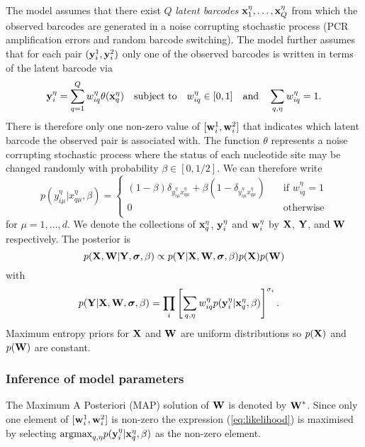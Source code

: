 \begin{footnotesize}
The model assumes that there exist $Q$ \emph{latent barcodes} $\boldsymbol{\mathbf{x}}_1^{\eta},\ldots,\boldsymbol{\mathbf{x}}_Q^{\eta}$ from which the observed barcodes are generated in a noise corrupting stochastic process (PCR amplification errors and random barcode switching). The model further assumes that for each pair $(\boldsymbol{\mathbf{y}}_i^1,\boldsymbol{\mathbf{y}}_i^2)$ only one of the observed barcodes is written in terms of the latent barcode via
\begin{equation}
\boldsymbol{\mathbf{y}}_i^{\eta} = \sum_{q=1}^Q w_{iq}^{\eta}\theta(\boldsymbol{\mathbf{x}}_{q}^{\eta})\quad\text{subject to}\quad w_{iq}^{\eta}\in[0,1]\quad\text{and}\quad\sum_{q,\eta} w_{iq}^{\eta} = 1.
\end{equation}
There is therefore only one non-zero value of $[\boldsymbol{\mathbf{w}}_i^1,\boldsymbol{\mathbf{w}}_i^2]$ that indicates which latent barcode the observed pair is associated with. The function $\theta$ represents a noise corrupting stochastic process where the status of each nucleotide site may be changed randomly with probability $\beta\in[0,1/2]$. We can therefore write
\begin{equation}
p(y_{i\mu}^{\eta}|x_{q\mu}^{\eta},\beta) = \left\{
\begin{array}{lr}
(1-\beta)\delta_{y_{i\mu}^{\eta}x_{q\mu}^{\eta}} + \beta (1-\delta_{y_{i\mu}^{\eta}x_{q\mu}^{\eta}})&\quad\text{if $w_{iq}^{\eta}=1$}\\
0&\quad\text{otherwise}\\
\end{array}
\right.
\end{equation}
for $\mu=1,\ldots,d$. We denote the collections of $\boldsymbol{\mathbf{x}}_{q}^{\eta}$, $\boldsymbol{\mathbf{y}}_i^{\eta}$ and $\boldsymbol{\mathbf{w}}_i^{\eta}$ by $\boldsymbol{\mathbf{X}}$, $\boldsymbol{\mathbf{Y}}$, and $\boldsymbol{\mathbf{W}}$ respectively. The posterior is
\begin{equation}
p(\boldsymbol{\mathbf{X}},\boldsymbol{\mathbf{W}}|\boldsymbol{\mathbf{Y}},\boldsymbol{\sigma},\beta) \propto p(\boldsymbol{\mathbf{Y}}|\boldsymbol{\mathbf{X}},\boldsymbol{\mathbf{W}},\boldsymbol{\sigma},\beta)p(\boldsymbol{\mathbf{X}})p(\boldsymbol{\mathbf{W}})
\end{equation}
with
\begin{align}
p(\boldsymbol{\mathbf{Y}}|\boldsymbol{\mathbf{X}},\boldsymbol{\mathbf{W}},\boldsymbol{\sigma},\beta) &=\prod_{i}\left[\sum_{q,\eta}w_{iq}^{\eta} p(\boldsymbol{\mathbf{y}}_i^{\eta}|\boldsymbol{\mathbf{x}}_q^{\eta},\beta)\right]^{\sigma_i}.
\label{eq:likelihood}
\end{align}
Maximum entropy priors for $\boldsymbol{\mathbf{X}}$ and $\boldsymbol{\mathbf{W}}$ are uniform distributions so $p(\boldsymbol{\mathbf{X}})$ and $p(\boldsymbol{\mathbf{W}})$ are constant.

\subsubsection{Inference of model parameters}

The Maximum A Posteriori (MAP) solution of $\boldsymbol{\mathbf{W}}$ is denoted by $\boldsymbol{\mathbf{W}}^*$. Since only one element of $[\boldsymbol{\mathbf{w}}_i^1,\boldsymbol{\mathbf{w}}^2_i]$ is non-zero the expression (\ref{eq:likelihood}) is maximised by selecting $\text{argmax}_{q,\eta} p(\boldsymbol{\mathbf{y}}_i^{\eta}|\boldsymbol{\mathbf{x}}_q^{\eta},\beta)$ as the non-zero element.


\end{footnotesize}

